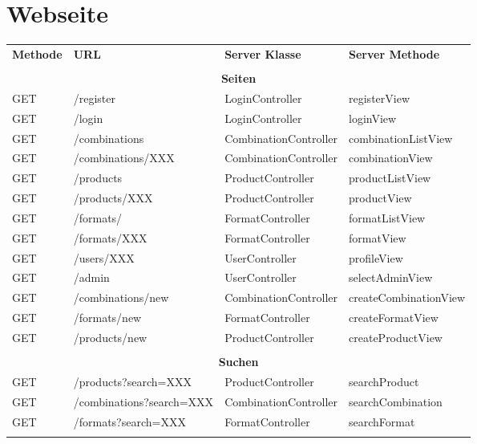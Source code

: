 \section{Webseite}
\begin{table}[h]
	\centering
	\begin{tabularx}{\textwidth}{l l l l}
		\rowcolor[HTML]{C0C0C0}
		\textbf{Methode} & \textbf{URL} & \textbf{Server Klasse} & \textbf{Server Methode}\\
		\\
		\multicolumn{4}{c}{\textbf{Seiten}}\\
		\rowcolor[HTML]{E7E7E7}
		GET & /register & LoginController & registerView \\
		GET & /login & LoginController & loginView \\
		\rowcolor[HTML]{E7E7E7}
		GET & /combinations & CombinationController & combinationListView \\
		GET & /combinations/XXX & CombinationController & combinationView \\
		\rowcolor[HTML]{E7E7E7}
		GET & /products & ProductController & productListView \\
		GET & /products/XXX & ProductController & productView \\
		\rowcolor[HTML]{E7E7E7}
		GET & /formats/ & FormatController & formatListView \\
		GET & /formats/XXX & FormatController & formatView \\
		\rowcolor[HTML]{E7E7E7}
		GET & /users/XXX  & UserController & profileView \\
		GET & /admin & UserController & selectAdminView \\
		\rowcolor[HTML]{E7E7E7}
		GET & /combinations/new & CombinationController & createCombinationView \\
		GET & /formats/new & FormatController & createFormatView \\
		\rowcolor[HTML]{E7E7E7}
		GET & /products/new & ProductController & createProductView \\
		\\
		\multicolumn{4}{c}{\textbf{Suchen}}\\
		GET & /products?search=XXX & ProductController & searchProduct \\
		\rowcolor[HTML]{E7E7E7}
		GET & /combinations?search=XXX & CombinationController & searchCombination \\
		GET & /formats?search=XXX & FormatController & searchFormat \\
		\\

\end{tabularx}
\end{table}
